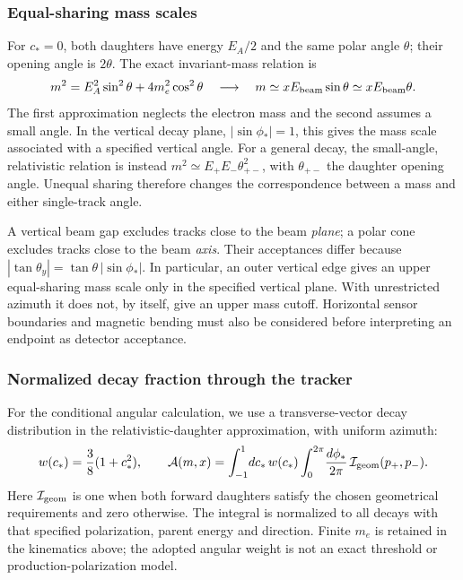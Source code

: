 \subsubsection{Equal-sharing mass scales}
\label{v571:equal-sharing}
For $c_*=0$, both daughters have energy $E_A/2$ and the same polar angle
$\theta$; their opening angle is $2\theta$.  The exact invariant-mass relation is
\begin{equation}
  m^2=E_A^2\sin^2\theta+4m_e^2\cos^2\theta
  \quad\longrightarrow\quad
  m\simeq xE_{\rm beam}\sin\theta
  \simeq xE_{\rm beam}\theta .
  \label{v571:equal-sharing-mass}
\end{equation}
The first approximation neglects the electron mass and the second assumes a
small angle.  In the vertical decay plane, $|\sin\phi_*|=1$, this gives the
mass scale associated with a specified vertical angle.  For a general decay,
the small-angle, relativistic relation is instead
$m^2\simeq E_+E_-\theta_{+-}^2$, with
$\theta_{+-}$ the daughter opening angle.  Unequal sharing therefore changes
the correspondence between a mass and either single-track angle.

A vertical beam gap excludes tracks close to the beam \emph{plane}; a polar
cone excludes tracks close to the beam \emph{axis}.  Their acceptances differ
because $|\tan\theta_y|=\tan\theta\,|\sin\phi_*|$.  In particular, an outer
vertical edge gives an upper equal-sharing mass scale only in the specified
vertical plane.  With unrestricted azimuth it does not, by itself, give an
upper mass cutoff.  Horizontal sensor boundaries and magnetic bending must
also be considered before interpreting an endpoint as detector acceptance.

\subsubsection{Normalized decay fraction through the tracker}
\label{v571:acceptance}
For the conditional angular calculation, we use a transverse-vector decay
distribution in the relativistic-daughter approximation, with uniform
azimuth:
\begin{equation}
  w(c_*)=\frac38(1+c_*^2),\qquad
  \mathcal A(m,x)=\int_{-1}^{1}\!dc_*\,w(c_*)
    \int_0^{2\pi}\!\frac{d\phi_*}{2\pi}\,
    \mathcal I_{\rm geom}(p_+,p_-).
  \label{v571:acceptance-integral}
\end{equation}
Here $\mathcal I_{\rm geom}$ is one when both forward daughters satisfy the
chosen geometrical requirements and zero otherwise.  The integral is
normalized to all decays with that specified polarization, parent energy and
direction.  Finite $m_e$ is retained in the kinematics above; the adopted
angular weight is not an exact threshold or production-polarization model.

